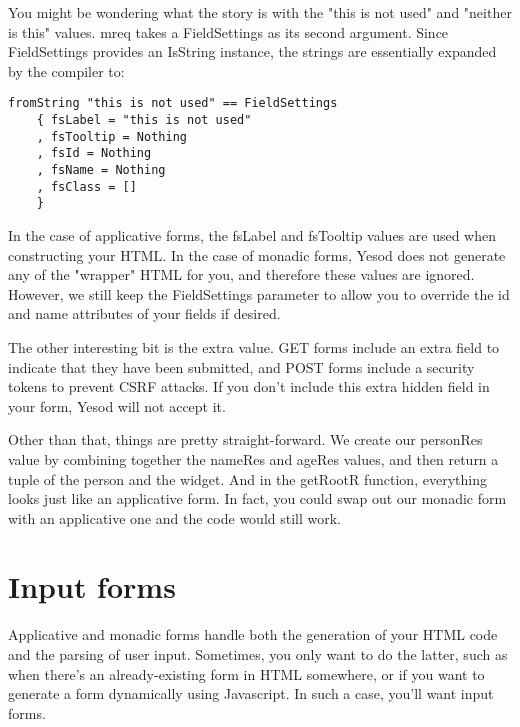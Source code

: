 You might be wondering what the story is with the "this is not used" and "neither is this"
values. mreq takes a FieldSettings as its second argument. Since FieldSettings provides an
IsString instance, the strings are essentially expanded by the compiler to:

\begin{lstlisting}
fromString "this is not used" == FieldSettings
    { fsLabel = "this is not used"
    , fsTooltip = Nothing
    , fsId = Nothing
    , fsName = Nothing
    , fsClass = []
    }
\end{lstlisting}

In the case of applicative forms, the fsLabel and fsTooltip values are used when
constructing your HTML. In the case of monadic forms, Yesod does not generate any of the
"wrapper" HTML for you, and therefore these values are ignored. However, we still keep the
FieldSettings parameter to allow you to override the id and name attributes of your fields
if desired.

The other interesting bit is the extra value. GET forms include an extra field to indicate
that they have been submitted, and POST forms include a security tokens to prevent CSRF
attacks. If you don't include this extra hidden field in your form, Yesod will not accept
it.

Other than that, things are pretty straight-forward. We create our personRes value by
combining together the nameRes and ageRes values, and then return a tuple of the person
and the widget. And in the getRootR function, everything looks just like an applicative
form. In fact, you could swap out our monadic form with an applicative one and the code
would still work.

\section{Input forms}

Applicative and monadic forms handle both the generation of your HTML code and the parsing
of user input. Sometimes, you only want to do the latter, such as when there's an
already-existing form in HTML somewhere, or if you want to generate a form dynamically
using Javascript. In such a case, you'll want input forms.


